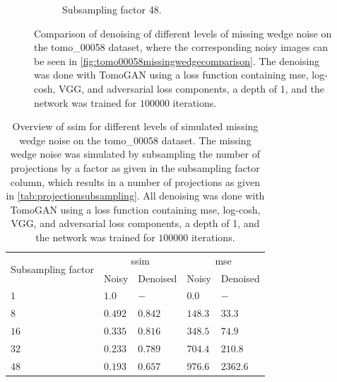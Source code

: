 \begin{figure}
\begin{subfigure}[t]{.45\textwidth}
    \caption{Subsampling factor 48. }
  \end{subfigure}
  \caption[Denoising of four different levels of missing wedge noise]{Comparison of denoising of different levels of missing wedge noise on the tomo\_00058 dataset, where the corresponding noisy images can be seen in \cref{fig:tomo00058missingwedgecomparison}. The denoising was done with TomoGAN using a loss function containing \acrshort{mse}, log-cosh, VGG, and adversarial loss components, a depth of 1, and the network was trained for $100 000$ iterations. }
  \label{fig:tomo00058missingwedgecomparisondenoised}
\end{figure}


\begin{table}[htbp]
  \centering
  \caption[SSIM for different levels of simulated missing wedge noise and corresponding values after denoising]{Overview of \acrshort{ssim} for different levels of simulated missing wedge noise on the tomo\_00058 dataset. The missing wedge noise was simulated by subsampling the number of projections by a factor as given in the subsampling factor column, which results in a number of projections as given in \cref{tab:projectionsubsampling}. All denoising was done with TomoGAN using a loss function containing \acrshort{mse}, log-cosh, VGG, and adversarial loss components, a depth of 1, and the network was trained for $100 000$ iterations. }
  \label{tab:missingwedgessim}
  \begin{tabular}{lllll}
  \hline
  \multirow{2}{*}{Subsampling factor} & \multicolumn{2}{c}{\acrshort{ssim}} & \multicolumn{2}{c}{\acrshort{mse}}  \\
  {} & Noisy & Denoised & Noisy & Denoised \\
  \hhline{=====}
  $1$  & $1.0$ & $-$ & $0.0$ & $-$ \\
  $8$  & $0.492$ & $0.842$ & $148.3$ & $33.3$ \\
  $16$ & $0.335$ & $0.816$ & $348.5$ & $74.9$ \\
  $32$ & $0.233$ & $0.789$ & $704.4$ & $210.8$ \\
  $48$ & $0.193$ & $0.657$ & $976.6$ & $2362.6$ \\
  \hline
  \end{tabular}
\end{table}

